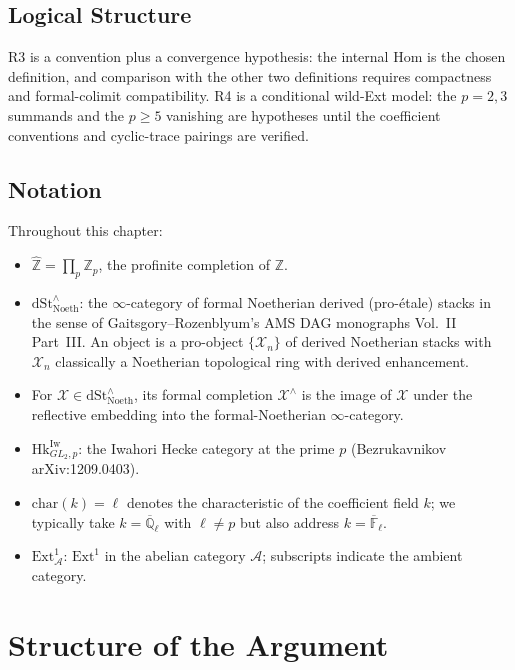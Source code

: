 \subsection{Logical Structure}

R3 is a convention plus a convergence hypothesis: the internal Hom is
the chosen definition, and comparison with the other two definitions
requires compactness and formal-colimit compatibility. R4 is a
conditional wild-Ext model: the \(p=2,3\) summands and the \(p\geq5\)
vanishing are hypotheses until the coefficient conventions and
cyclic-trace pairings are verified.

\subsection{Notation}

Throughout this chapter:
\begin{itemize}
\item \(\widehat{\mathbb{Z}}=\prod_{p}\mathbb{Z}_{p}\), the profinite
completion of \(\mathbb{Z}\).
\item \(\mathrm{dSt}^{\wedge}_{\mathrm{Noeth}}\): the
\(\infty\)-category of formal Noetherian derived (pro-\'etale)
stacks in the sense of Gaitsgory--Rozenblyum's AMS DAG monographs
Vol.~II Part~III. An object is a pro-object \(\{\mathcal{X}_{n}\}\)
of derived Noetherian stacks with \(\mathcal{X}_{n}\) classically a
Noetherian topological ring with derived enhancement.
\item For \(\mathcal{X}\in\mathrm{dSt}^{\wedge}_{\mathrm{Noeth}}\),
its formal completion \(\mathcal{X}^{\wedge}\) is the image of
\(\mathcal{X}\) under the reflective embedding into the
formal-Noetherian \(\infty\)-category.
\item \(\mathrm{Hk}^{\mathrm{Iw}}_{GL_{2},p}\): the Iwahori Hecke
category at the prime \(p\) (Bezrukavnikov arXiv:1209.0403).
\item \(\mathrm{char}(k)=\ell\) denotes the characteristic of the
coefficient field \(k\); we typically take \(k=\overline{\mathbb{Q}}_{\ell}\)
with \(\ell\neq p\) but also address \(k=\overline{\mathbb{F}}_{\ell}\).
\item \(\mathrm{Ext}^{1}_{\mathcal{A}}\): \(\mathrm{Ext}^{1}\) in the
abelian category \(\mathcal{A}\); subscripts indicate the ambient
category.
\end{itemize}

\section{Structure of the Argument}
\label{v4-arith:bzn-rcompletion:table}

